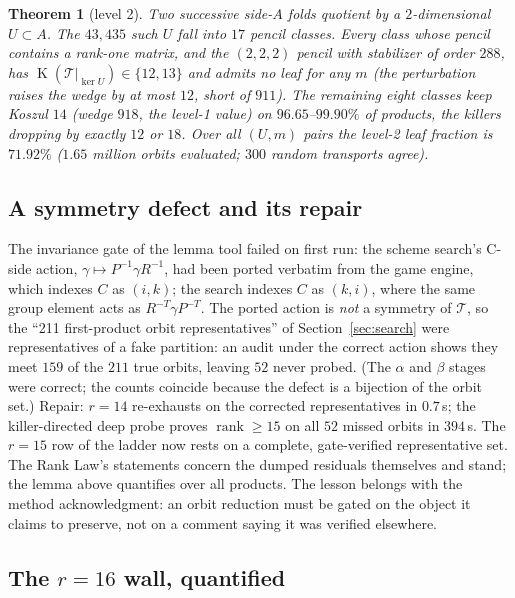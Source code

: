 \documentclass[11pt]{article}
\newtheorem{theorem}{Theorem}
\theoremstyle{definition}
\newcommand{\T}{\mathcal{T}}
\newcommand{\rk}{\operatorname{rank}}
\newcommand{\kos}{\operatorname{K}}
\begin{document}
\begin{theorem}[level 2]
Two successive side-$A$ folds quotient by a $2$-dimensional $U\subset A$.
The $43{,}435$ such $U$ fall into $17$ pencil classes. Every class whose
pencil contains a rank-one matrix, and the $(2,2,2)$ pencil with
stabilizer of order $288$, has $\kos(\T|_{\ker U})\in\{12,13\}$ and admits
\emph{no} leaf for any $m$ (the perturbation raises the wedge by at most
$12$, short of $911$). The remaining eight classes keep Koszul $14$ (wedge
$918$, the level-1 value) on $96.65$--$99.90\%$ of products, the killers
dropping by exactly $12$ or $18$. Over all $(U,m)$ pairs the level-2 leaf
fraction is $71.92\%$ ($1.65$ million orbits evaluated; $300$ random
transports agree).
\end{theorem}

\subsection{A symmetry defect and its repair}

The invariance gate of the lemma tool failed on first run: the scheme
search's C-side action, $\gamma\mapsto P^{-1}\gamma R^{-1}$, had been ported
verbatim from the game engine, which indexes $C$ as $(i,k)$; the search
indexes $C$ as $(k,i)$, where the same group element acts as
$R^{-T}\gamma P^{-T}$. The ported action is \emph{not} a symmetry of $\T$,
so the ``211 first-product orbit representatives'' of
Section~\ref{sec:search} were representatives of a fake partition: an
audit under the correct action shows they meet $159$ of the $211$ true
orbits, leaving $52$ never probed. (The $\alpha$ and $\beta$ stages were
correct; the counts coincide because the defect is a bijection of the
orbit set.) Repair: $r=14$ re-exhausts on the corrected representatives
in $0.7$\,s; the killer-directed deep probe proves $\rk \ge 15$ on all
$52$ missed orbits in $394$\,s. The $r=15$ row of the ladder now rests on
a complete, gate-verified representative set. The Rank Law's statements
concern the dumped residuals themselves and stand; the lemma above
quantifies over all products. The lesson belongs with the method
acknowledgment: an orbit reduction must be gated on the object it claims
to preserve, not on a comment saying it was verified elsewhere.

\subsection{The $r=16$ wall, quantified}
\end{document}
